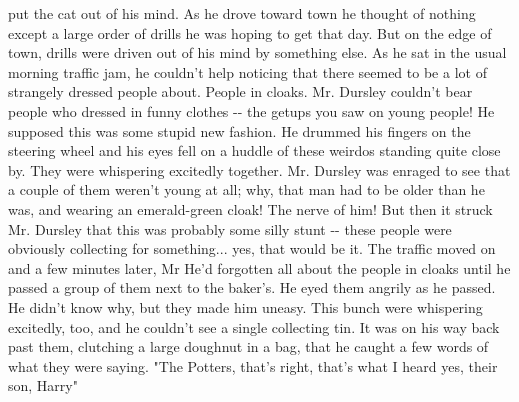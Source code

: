 \documentclass{article}%
\begin{document}
put the cat out of his mind. As he drove toward town he thought of
\newline%
nothing except a large order of drills he was hoping to get that day.
\newline%
But on the edge of town, drills were driven out of his mind by something
\newline%
else. As he sat in the usual morning traffic jam, he couldn't help
\newline%
noticing that there seemed to be a lot of strangely dressed people
\newline%
about. People in cloaks. Mr. Dursley couldn't bear people who dressed in
\newline%
funny clothes {-}{-} the getups you saw on young people! He supposed this
\newline%
was some stupid new fashion. He drummed his fingers on the steering
\newline%
wheel and his eyes fell on a huddle of these weirdos standing quite
\newline%
close by. They were whispering excitedly together. Mr. Dursley was
\newline%
enraged to see that a couple of them weren't young at all; why, that man
\newline%
had to be older than he was, and wearing an emerald{-}green cloak! The
\newline%
nerve of him! But then it struck Mr. Dursley that this was probably some
\newline%
silly stunt {-}{-} these people were obviously collecting for something...
\newline%
yes, that would be it. The traffic moved on and a few minutes later, Mr
\newline%
He'd forgotten all about the people in cloaks until he passed a group of
\newline%
them next to the baker's. He eyed them angrily as he passed. He didn't
\newline%
know why, but they made him uneasy. This bunch were whispering
\newline%
excitedly, too, and he couldn't see a single collecting tin. It was on
\newline%
his way back past them, clutching a large doughnut in a bag, that he
\newline%
caught a few words of what they were saying.
\newline%
"The Potters, that's right, that's what I heard yes, their son, Harry"
\end{document}
